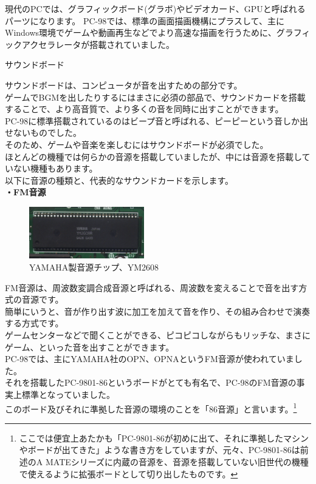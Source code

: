 \documentclass[b5paper,9pt,platex,dvipdfmx]{jsarticle}
\begin{document}
\begin{multicols*}{3}
\begin{enumerate}
  現代のPCでは、グラフィックボード(グラボ)やビデオカード、GPUと呼ばれるパーツになります。
  PC-98では、標準の画面描画機構にプラスして、主にWindows環境でゲームや動画再生などでより高速な描画を行うために、グラフィックアクセラレータが搭載されていました。\\
  {\bf  \item サウンドボード\\}
  サウンドボードは、コンピュータが音を出すための部分です。\\
  ゲームでBGMを出したりするにはまさに必須の部品で、サウンドカードを搭載することで、より高音質で、より多くの音を同時に出すことができます。\\
  PC-98に標準搭載されているのはビープ音と呼ばれる、ピーピーという音しか出せないものでした。\\
  そのため、ゲームや音楽を楽しむにはサウンドボードが必須でした。\\
  ほとんどの機種では何らかの音源を搭載していましたが、中には音源を搭載していない機種もあります。\\
  以下に音源の種類と、代表的なサウンドカードを示します。\\
  {\bf ・FM音源 \\}
  \begin{figure}[H]
    \centering
    \includegraphics[width=5cm]{img-4.jpg}
    \caption{YAMAHA製音源チップ、YM2608}
  \end{figure}
  FM音源は、周波数変調合成音源と呼ばれる、周波数を変えることで音を出す方式の音源です。\\
  簡単にいうと、音が作り出す波に加工を加えて音を作り、その組み合わせで演奏する方式です。\\
  ゲームセンターなどで聞くことができる、ピコピコしながらもリッチな、まさにゲーム、といった音を出すことができます。\\
  PC-98では、主にYAMAHA社のOPN、OPNAというFM音源が使われていました。\\
  それを搭載したPC-9801-86というボードがとても有名で、PC-98のFM音源の事実上標準となっていました。\\
  このボード及びそれに準拠した音源の環境のことを「86音源」と言います。\footnote{ここでは便宜上あたかも「PC-9801-86が初めに出て、それに準拠したマシンやボードが出てきた」ような書き方をしていますが、元々、PC-9801-86は前述のA MATEシリーズに内蔵の音源を、音源を搭載していない旧世代の機種で使えるように拡張ボードとして切り出したものです。}\\

\end{enumerate}
\end{multicols*}
\end{document}
